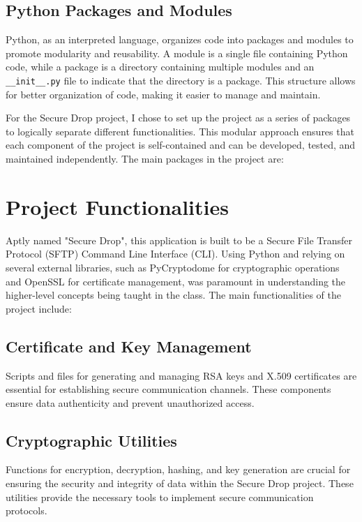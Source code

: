 \documentclass[12pt]{article}
\begin{document}
\subsection{Python Packages and Modules}
Python, as an interpreted language, organizes code into packages and modules to promote modularity and reusability. A module is a single file containing Python code, while a package is a directory containing multiple modules and an \texttt{\_\_init\_\_.py} file to indicate that the directory is a package. This structure allows for better organization of code, making it easier to manage and maintain.

For the Secure Drop project, I chose to set up the project as a series of packages to logically separate different functionalities. This modular approach ensures that each component of the project is self-contained and can be developed, tested, and maintained independently. The main packages in the project are:


\newpage

\section{Project Functionalities}
Aptly named "Secure Drop", this application is built to be a Secure File Transfer Protocol (SFTP) Command Line Interface (CLI).
Using Python and relying on several external libraries, such as PyCryptodome for cryptographic operations and OpenSSL for certificate management, was paramount in understanding the higher-level concepts being taught in the class.
The main functionalities of the project include:

\subsection{Certificate and Key Management}
Scripts and files for generating and managing RSA keys and X.509 certificates are essential for establishing secure communication channels. These components ensure data authenticity and prevent unauthorized access.

\subsection{Cryptographic Utilities}
Functions for encryption, decryption, hashing, and key generation are crucial for ensuring the security and integrity of data within the Secure Drop project. These utilities provide the necessary tools to implement secure communication protocols.
\end{document}
